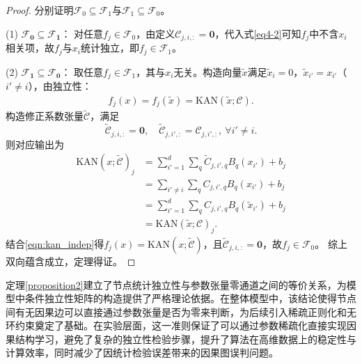 \begin{proof}
	分别证明$\mathcal{F}_0 \subseteq \mathcal{F}_1$与$\mathcal{F}_1 \subseteq \mathcal{F}_0$。
	
	\noindent(1) $\boldsymbol{\mathcal{F}_0 \subseteq \mathcal{F}_1}$：
	对任意$f_j \in \mathcal{F}_0$，由定义$\mathcal{C}_{j,i,:} = \mathbf{0}$，代入式\eqref{eq4-2}可知$f_j$中不含$x_i$相关项，故$f_j$与$x_i$统计独立，即$f_j \in \mathcal{F}_1$。
	
	\noindent(2) $\boldsymbol{\mathcal{F}_1 \subseteq \mathcal{F}_0}$：
	取任意$f_j \in \mathcal{F}_1$，其与$x_i$无关。构造向量$\tilde{x}$满足$\tilde{x}_i = 0$，$\tilde{x}_{i'} = x_{i'}$（$i' \neq i$），由独立性：
	\begin{align}\label{eqn:kan_indep}
		f_j(x) = f_j(\tilde{x}) = \mathrm{KAN}(\tilde{x};\mathcal{C}).
	\end{align}
	构造修正系数张量$\tilde{\mathcal{C}}$，满足
	$$
	\tilde{\mathcal{C}}_{j,i,:} = \mathbf{0}, \quad \tilde{\mathcal{C}}_{j,i',:} = \mathcal{C}_{j,i',:},\ \forall i' \neq i.
	$$
	则对应输出为
	\begin{align*}
		\mathrm{KAN}(x;\tilde{\mathcal{C}})_j
		&= \sum_{i'=1}^{d} \sum_q \tilde{C}_{j,i',q} B_q(x_{i'}) + b_j \\
		&= \sum_{i'\neq i} \sum_q C_{j,i',q} B_q(x_{i'}) + b_j \\
		&= \sum_{i'=1}^{d} \sum_q C_{j,i',q} B_q(\tilde{x}_{i'}) + b_j \\
		&= \mathrm{KAN}(\tilde{x};\mathcal{C})_j.
	\end{align*}
	结合\eqref{eqn:kan_indep}得$f_j(x) = \mathrm{KAN}(x;\tilde{\mathcal{C}})$，且$\tilde{\mathcal{C}}_{j,i,:}=\mathbf{0}$，故$f_j \in \mathcal{F}_0$。
	综上双向蕴含成立，定理得证。
\end{proof}

定理\ref{proposition2}建立了节点统计独立性与参数张量零通道之间的等价关系，为模型中条件独立性矩阵的构造提供了严格理论依据。在整体模型中，该结论使得节点间有无因果边可以直接通过参数张量是否为零来判断，为后续引入稀疏正则化和无环约束奠定了基础。在实验层面，这一准则保证了可以通过参数稀疏化直接实现因果结构学习，避免了复杂的独立性检验步骤，提升了算法在高维数据上的稳定性与计算效率，同时减少了因统计检验误差带来的因果图误判问题。


